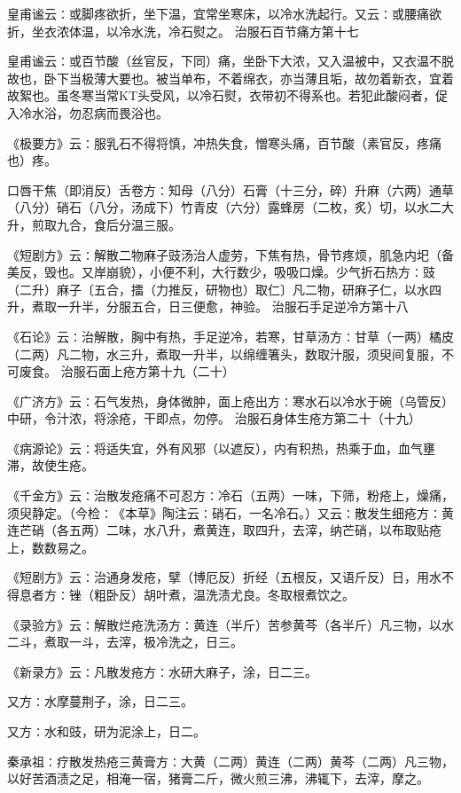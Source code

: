 \documentclass[a4paper,12pt,UTF8,twoside]{ctexbook}
\begin{document}
皇甫谧云∶或脚疼欲折，坐下温，宜常坐寒床，以冷水洗起行。又云∶或腰痛欲折，坐衣浓体温，以冷水洗，冷石熨之。
治服石百节痛方第十七

皇甫谧云∶或百节酸（丝官反，下同）痛，坐卧下大浓，又入温被中，又衣温不脱故也，卧下当极薄大要也。被当单布，不着绵衣，亦当薄且垢，故勿着新衣，宜着故絮也。虽冬寒当常KT头受风，以冷石熨，衣带初不得系也。若犯此酸闷者，促入冷水浴，勿忍病而畏浴也。

《极要方》云∶服乳石不得将慎，冲热失食，憎寒头痛，百节酸（素官反，疼痛也）疼。

口唇干焦（即消反）舌卷方∶知母（八分）石膏（十三分，碎）升麻（六两）通草（八分）硝石（八分，汤成下）竹青皮（六分）露蜂房（二枚，炙）切，以水二大升，煎取九合，食后分温三服。

《短剧方》云∶解散二物麻子豉汤治人虚劳，下焦有热，骨节疼烦，肌急内圯（备美反，毁也。又岸崩貌），小便不利，大行数少，吸吸口燥。少气折石热方∶豉（二升）麻子〔五合，擂（力推反，研物也）取仁〕凡二物，研麻子仁，以水四升，煮取一升半，分服五合，日三便愈，神验。
治服石手足逆冷方第十八

《石论》云∶治解散，胸中有热，手足逆冷，若寒，甘草汤方∶甘草（一两）橘皮（二两）凡二物，水三升，煮取一升半，以绵缠箸头，数取汁服，须臾间复服，不可废食。
治服石面上疮方第十九（二十）

《广济方》云∶石气发热，身体微肿，面上疮出方∶寒水石以冷水于碗（乌管反）中研，令汁浓，将涂疮，干即点，勿停。
治服石身体生疮方第二十（十九）

《病源论》云∶将适失宜，外有风邪（以遮反），内有积热，热乘于血，血气壅滞，故使生疮。

《千金方》云∶治散发疮痛不可忍方∶冷石（五两）一味，下筛，粉疮上，燥痛，须臾静定。（今检∶《本草》陶注云∶硝石，一名冷石。）又云∶散发生细疮方∶黄连芒硝（各五两）二味，水八升，煮黄连，取四升，去滓，纳芒硝，以布取贴疮上，数数易之。

《短剧方》云∶治通身发疮，擘（博厄反）折经（五根反，又语斤反）日，用水不得息者方∶锉（粗卧反）胡叶煮，温洗渍尤良。冬取根煮饮之。

《录验方》云∶解散烂疮洗汤方∶黄连（半斤）苦参黄芩（各半斤）凡三物，以水二斗，煮取一斗，去滓，极冷洗之，日三。

《新录方》云∶凡散发疮方∶水研大麻子，涂，日二三。

又方∶水摩蔓荆子，涂，日二三。

又方∶水和豉，研为泥涂上，日二。

秦承祖∶疗散发热疮三黄膏方∶大黄（二两）黄连（二两）黄芩（二两）凡三物，以好苦酒渍之足，相淹一宿，猪膏二斤，微火煎三沸，沸辄下，去滓，摩之。
\end{document}
